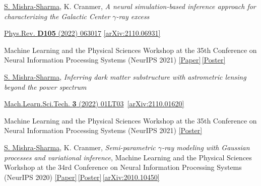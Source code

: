 \documentclass[letterpaper,11pt]{article}
\newenvironment{packed_itemize}{
\begin{itemize}[label=\raisebox{0.25ex}{\tiny$\bullet$}]
  \setlength{\itemsep}{4.2pt}
  \setlength{\parskip}{0pt}
  \setlength{\parsep}{0pt}}{\end{itemize}
}
\newenvironment{packed_enumerate}[1][]{
\begin{etaremune}[#1]
  \setlength{\itemsep}{3.7pt}
  \setlength{\parskip}{0pt}
  \setlength{\parsep}{0pt}}{\end{etaremune}
}
\begin{document}
\begin{packed_enumerate}[start=37]
  \item  \underline{S. Mishra-Sharma}, K. Cranmer, \emph{A neural simulation-based inference approach for characterizing the Galactic Center $\gamma$-ray excess}
    \begin{packed_itemize}
      \item {\href{https://journals.aps.org/prd/abstract/10.1103/PhysRevD.105.063017}{Phys.Rev. \textbf{D105} (2022) 063017} \href{https://arxiv.org/abs/2110.06931}{[arXiv:2110.06931]}}
      \item {Machine Learning and the Physical Sciences Workshop at the 35th Conference on Neural Information Processing Systems (NeurIPS 2021) \href{https://ml4physicalsciences.github.io/2020/files/NeurIPS_ML4PS_2020_20.pdf}{[Paper]}\,\href{https://ml4physicalsciences.github.io/2020/files/NeurIPS_ML4PS_2020_20_poster.pdf}{[Poster]}}
    \end{packed_itemize}


  \item \underline{S. Mishra-Sharma}, \emph{Inferring dark matter substructure with astrometric lensing beyond the power spectrum}  
  \begin{packed_itemize}
    \item {\href{https://doi.org/10.1088/2632-2153/ac494a}{Mach.Learn.Sci.Tech. \textbf{3} (2022) 01LT03} \,\href{https://arxiv.org/abs/2110.01620}{[arXiv:2110.01620]}}
    \item {{Machine Learning and the Physical Sciences Workshop at the 35th Conference on Neural Information Processing Systems (NeurIPS 2021)} \href{https://ml4physicalsciences.github.io/2021/files/NeurIPS_ML4PS_2021_22_poster.png}{[Poster]}}
    \end{packed_itemize}

  \item\underline{S. Mishra-Sharma}, K. Cranmer, \emph{Semi-parametric $\gamma$-ray modeling with Gaussian processes and variational inference}, {Machine Learning and the Physical Sciences Workshop at the 34rd Conference on Neural Information Processing Systems (NeurIPS 2020)} \href{https://ml4physicalsciences.github.io/2020/files/NeurIPS_ML4PS_2020_20.pdf}{[Paper]}\,\href{https://ml4physicalsciences.github.io/2020/files/NeurIPS_ML4PS_2020_20_poster.pdf}{[Poster]}\,\href{https://arxiv.org/abs/2010.10450}{[arXiv:2010.10450]} 


\end{packed_enumerate}
\end{document}
